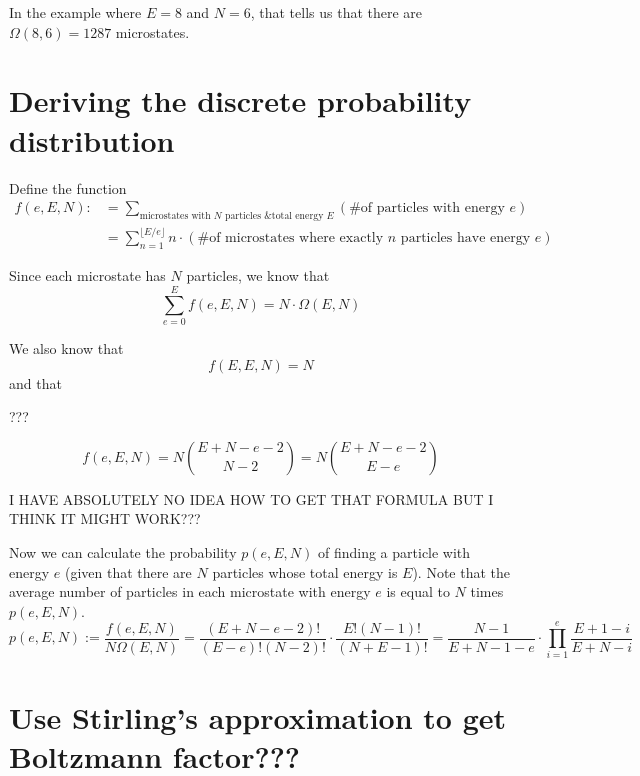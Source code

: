 \documentclass[12pt]{article}
\begin{document}
In the example where $E=8$ and $N=6$, that tells us that there are $\Omega(8, 6) = 1287$ microstates.

\section{Deriving the discrete probability distribution}

Define the function
\begin{align*}
    f(e, E, N) :&= \sum_{\text{microstates with $N$ particles \& total energy $E$}} (\text{\# of particles with energy $e$}) \\
    &= \sum_{n=1}^{\lfloor E / e \rfloor} n \cdot (\text{\# of microstates where exactly $n$ particles have energy $e$})
\end{align*}

Since each microstate has $N$ particles, we know that
\[\sum_{e=0}^E f(e, E, N) = N \cdot \Omega(E, N)\]

We also know that
\[f(E, E, N) = N\]
and that

???

\[f(e, E, N) = N {{E + N - e - 2} \choose {N - 2}} = N {{E + N - e - 2} \choose {E - e}}\]

I HAVE ABSOLUTELY NO IDEA HOW TO GET THAT FORMULA BUT I THINK IT MIGHT WORK???

Now we can calculate the probability $p(e, E, N)$ of finding a particle with energy $e$ (given that there are $N$ particles whose total energy is $E$). Note that the average number of particles in each microstate with energy $e$ is equal to $N$ times $p(e, E, N)$.
\[p(e, E, N) := \frac{f(e, E, N)}{N \Omega(E, N)} = \frac{(E+N-e-2)!}{(E-e)!(N-2)!} \cdot \frac{E!(N-1)!}{(N+E-1)!} = \frac{N-1}{E+N-1-e} \cdot \prod_{i=1}^e \frac{E+1-i}{E+N-i} \]

\section{Use Stirling's approximation to get Boltzmann factor???}
\end{document}
